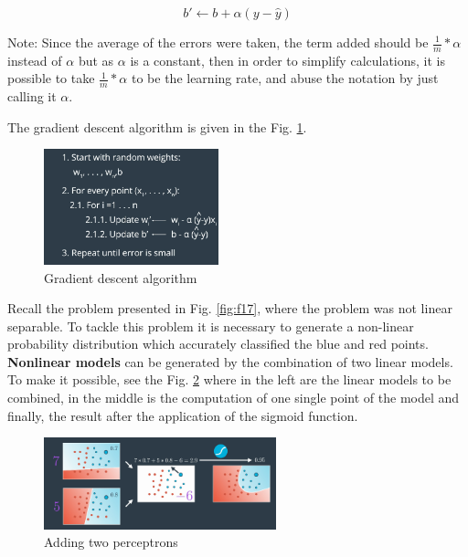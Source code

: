\documentclass{article}
\begin{document}
\begin{equation}
\label{eq:22}
b' \leftarrow b + \alpha(y - \hat{y})
\end{equation}

Note: Since the average of the errors were taken, the term added should be \(\frac{1}{m}*\alpha\) instead of \(\alpha\) but as \(\alpha\) is a constant, then in order to simplify calculations, it is possible to take \(\frac{1}{m}*\alpha\) to be the learning rate, and abuse the notation by just calling it \(\alpha\).

The gradient descent algorithm is given in the Fig. \ref{fig:f27}.

\begin{figure}[ht]
    \centering
    \includegraphics[width=0.45\textwidth,height=0.45\textheight,keepaspectratio]{images/gradient_algorithm.png}
    \captionsetup{justification=centering}
    \caption{Gradient descent algorithm}
    \label{fig:f27}
\end{figure}

Recall the problem presented in Fig. \ref{fig:f17}, where the problem was not linear separable. To tackle this problem it is necessary to generate a non-linear probability distribution which accurately classified the blue and red points.
\textbf{Nonlinear models} can be generated by the combination of two linear models. To make it possible, see the Fig. \ref{fig:f28} where in the left are the linear models to be combined, in the middle is the computation of one single point of the model and finally, the result after the application of the sigmoid function. 

\begin{figure}[ht]
    \centering
    \includegraphics[width=0.6\textwidth,height=0.6\textheight,keepaspectratio]{images/adding_perceptrons.png}
    \captionsetup{justification=centering}
    \caption{Adding two perceptrons}
    \label{fig:f28}
\end{figure}
\end{document}
